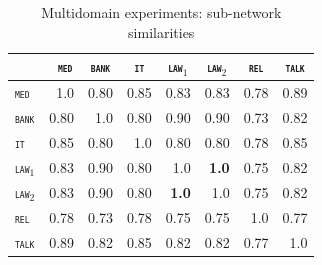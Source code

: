 \documentclass[11pt]{article}
\newcommand{\domain}[1]{\texttt{\textsc{#1}}}
\newcommand{\SB}[1]{\textbf{#1}}
\begin{document}
\begin{table}[h!]
  \centering
  \begin{tabular}{|p{1cm}|*{7}{r|}} \hline
    & \multicolumn{1}{c|}{\domain{ med}} & \multicolumn{1}{c|}{\domain{bank}}& \multicolumn{1}{c|}{\domain{ it }} & \multicolumn{1}{c|}{\domain{law$_1$}} & \multicolumn{1}{c|}{\domain{law$_2$}} & \multicolumn{1}{c|}{\domain{rel}} &\multicolumn{1}{c|}{\domain{talk}} \\ \hline 
    \domain{med} &1.0&0.80&0.85&0.83&0.83&0.78&0.89\\
    \domain{bank} &0.80&1.0&0.80&0.90&0.90&0.73&0.82\\
    \domain{it} &0.85&0.80&1.0&0.80&0.80&0.78&0.85\\
    \domain{law$_1$} &0.83&0.90&0.80&1.0&\SB{1.0}&0.75&0.82\\ 
    \domain{law$_2$} &0.83&0.90&0.80&\SB{1.0}&1.0&0.75&0.82\\ 
    \domain{rel} &0.78&0.73&0.78&0.75&0.75&1.0&0.77\\
    \domain{talk} &0.89&0.82&0.85&0.82&0.82&0.77&1.0\\
    \hline
  \end{tabular}
  \caption{Multidomain experiments: sub-network similarities}
  \label{tab:fuzzy-sim}
\end{table}      
\end{document}
